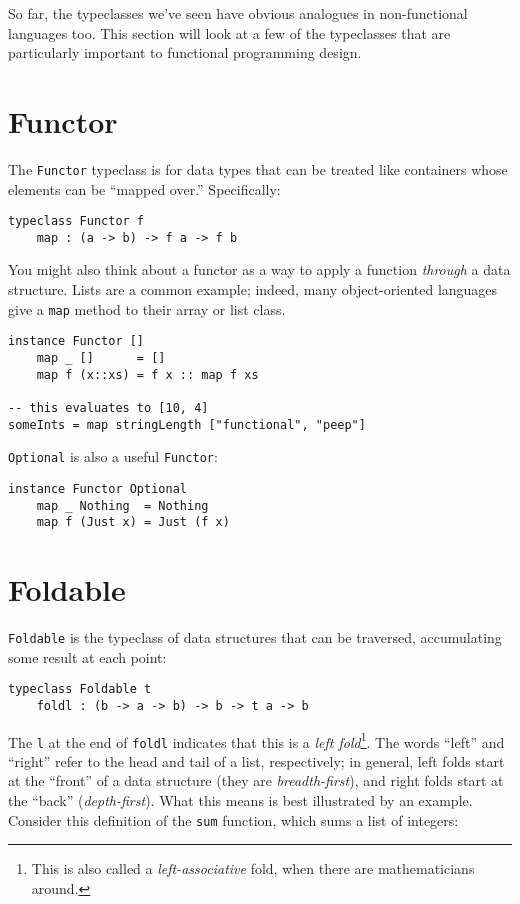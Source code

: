 \documentclass{book}
\newcommand{\mlil}[1]{\lstinline[language=pseudoml,columns=fixed]|#1|}\usepackage{caption}
\begin{document}
So far, the typeclasses we've seen have obvious analogues in non-functional languages too. This section will look at a few of the typeclasses that are particularly important to functional programming design.

\section{Functor}

The \mlil{Functor} typeclass is for data types that can be treated like containers whose elements can be ``mapped over.'' Specifically:

\begin{lstlisting}[language=pseudoml]
typeclass Functor f
    map : (a -> b) -> f a -> f b
\end{lstlisting}

You might also think about a functor as a way to apply a function \emph{through} a data structure. Lists are a common example; indeed, many object-oriented languages give a \mlil{map} method to their array or list class.

\begin{lstlisting}[language=pseudoml]
instance Functor []
    map _ []      = []
    map f (x::xs) = f x :: map f xs

-- this evaluates to [10, 4]
someInts = map stringLength ["functional", "peep"]
\end{lstlisting}

\mlil{Optional} is also a useful \mlil{Functor}:

\begin{lstlisting}[language=pseudoml]
instance Functor Optional
    map _ Nothing  = Nothing
    map f (Just x) = Just (f x)
\end{lstlisting}

\section{Foldable}

\mlil{Foldable} is the typeclass of data structures that can be traversed, accumulating some result at each point:

\begin{lstlisting}[language=pseudoml]
typeclass Foldable t
    foldl : (b -> a -> b) -> b -> t a -> b
\end{lstlisting}

The \texttt{l} at the end of \texttt{foldl} indicates that this is a \emph{left fold}\footnote{This is also called a \emph{left-associative} fold, when there are mathematicians around.}. The words ``left'' and ``right'' refer to the head and tail of a list, respectively; in general, left folds start at the ``front'' of a data structure (they are \emph{breadth-first}), and right folds start at the ``back'' (\emph{depth-first}). What this means is best illustrated by an example. Consider this definition of the \mlil{sum} function, which sums a list of integers:
\end{document}
